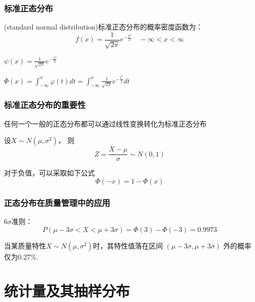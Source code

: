 \documentclass[UTF8,10pt]{book}
\begin{document}
            \subsection{标准正态分布}
                (standard normal distribution)标准正态分布的概率密度函数为：
                $$ f(x) = \frac{1}{\sqrt{2\pi}} e^{-\frac{x^2}{2} }
                \quad
                -\infty < x < \infty
                $$

                $   \psi(x) =  \frac{1}{\sqrt{2\pi}} e^{-\frac{x^2}{2} }  $

                $   \Phi(x) = \int_{-\infty}^x \varphi(t) dt 
                = \int_{-\infty}^x \frac{1}{\sqrt{2\pi}} e^{-\frac{t^2}{2} } dt   $
            
            \subsection{标准正态分布的重要性}
                任何一个一般的正态分布都可以通过线性变换转化为标准正态分布

                设$X\sim N(\mu,\sigma^2) $， 则
                $$ Z = \frac{X-\mu}{\sigma} \sim N(0,1)$$

                对于负值，可以采取如下公式
                $$ \Phi(-x) = 1-\Phi(x) $$

            \subsection{正态分布在质量管理中的应用}
                $6\sigma$准则：
                $$ P(\mu - 3\sigma < X < \mu+3\sigma)
                = \Phi(3) - \Phi(-3)
                = 0.9973 $$

                {\kaishu 当某质量特性$X\sim N(\mu,\sigma^2) $时，其特性值落在区间 $(\mu-3\sigma,\mu+3\sigma)$
                外的概率仅为$0.27\%$.}



\clearpage
\chapter{统计量及其抽样分布}
\end{document}
